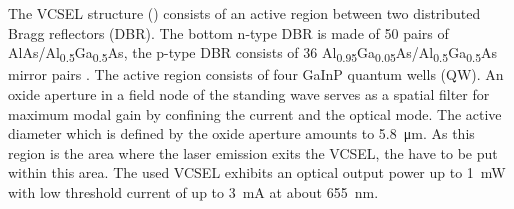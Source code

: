 	The VCSEL structure () consists of an active region between two distributed Bragg reflectors (DBR). 
	The bottom n-type DBR is made of 50 pairs of AlAs/Al\textsubscript{0.5}Ga\textsubscript{0.5}As, the p-type DBR consists of 36 Al\textsubscript{0.95}Ga\textsubscript{0.05}As/Al\textsubscript{0.5}Ga\textsubscript{0.5}As mirror pairs \cite{Weidenfeld2012}. 
	The active region consists of four GaInP quantum wells (QW). 
	An oxide aperture in a field node of the standing wave serves as a spatial filter for maximum modal gain by confining the current and the optical mode.
	The active diameter which is defined by the oxide aperture amounts to \SI{5.8}{\micro\meter}.
	As this region is the area where the laser emission exits the VCSEL, the \nds have to be put within this area.
	The used VCSEL exhibits an optical output power up to \SI{1}{\milli\watt} with low threshold current of up to \SI{3}{\milli\ampere} at about \SI{655}{nm}. 

